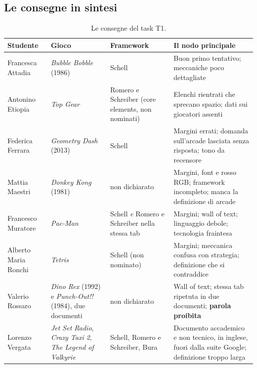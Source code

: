 \subsection{Le consegne in sintesi}

\begin{table}[htbp]
  \centering
  \caption{Le consegne del task T1.}
  \label{rv:t1:tab:consegne}
  \small
  \begin{tabular}{@{}p{2.3cm}p{2.7cm}p{2.4cm}p{3.9cm}@{}}
    \toprule
    \textbf{Studente} & \textbf{Gioco} & \textbf{Framework} &
    \textbf{Il nodo principale} \\
    \midrule
    Francesca Attadia & \emph{Bubble Bobble} (1986) & Schell &
      Buon primo tentativo; meccaniche poco dettagliate \\
    \addlinespace
    Antonino Etiopia & \emph{Top Gear} & Romero e Schreiber (core
      elements, non nominati) & Elenchi rientrati che sprecano spazio; dati
      sui giocatori assenti \\
    \addlinespace
    Federica Ferrara & \emph{Geometry Dash} (2013) & Schell &
      Margini errati; domanda sull'arcade lasciata senza risposta; tono da
      recensore \\
    \addlinespace
    Mattia Maestri & \emph{Donkey Kong} (1981) & non dichiarato &
      Margini, font e rosso RGB; framework incompleto; manca la definizione
      di arcade \\
    \addlinespace
    Francesco Muratore & \emph{Pac-Man} & Schell \emph{e} Romero e
      Schreiber nella stessa tab & Margini; wall of text; linguaggio debole;
      tecnologia fraintesa \\
    \addlinespace
    Alberto Maria Ronchi & \emph{Tetris} & Schell (non nominato) &
      Margini; meccanica confusa con strategia; definizione che si
      contraddice \\
    \addlinespace
    Valerio Rossaro & \emph{Dino Rex} (1992) e \emph{Punch-Out!!} (1984),
      due documenti & non dichiarato & Wall of text; stessa tab ripetuta
      in due documenti; \textbf{parola proibita} \\
    \addlinespace
    Lorenzo Vergata & \emph{Jet Set Radio}, \emph{Crazy Taxi 2},
      \emph{The Legend of Valkyrie} & Schell, Romero e Schreiber, Bura &
      Documento accademico e non tecnico, in inglese, fuori dalla suite
      Google; definizione troppo larga \\
    \bottomrule
  \end{tabular}
\end{table}

